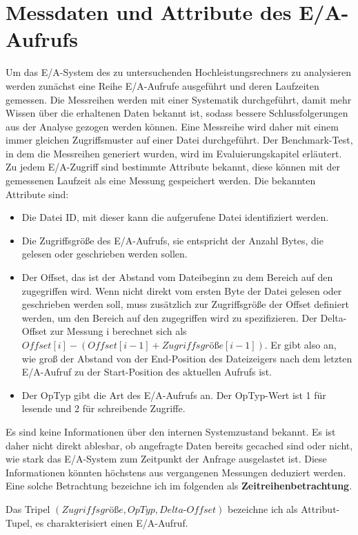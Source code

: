 \documentclass[
	12pt,
	a4paper,
	BCOR10mm,
	DIV14,
	listof=totoc,
	bibliography=totoc,
	headsepline
]{scrreprt}
\begin{document}
\section{Messdaten und Attribute des E/A-Aufrufs}
\label{analyse:mess+att}
Um das E/A-System des zu untersuchenden Hochleistungsrechners zu analysieren werden zunächst eine Reihe E/A-Aufrufe ausgeführt und deren Laufzeiten gemessen. Die Messreihen werden mit einer Systematik durchgeführt, damit mehr Wissen über die erhaltenen Daten bekannt ist, sodass bessere Schlussfolgerungen aus der Analyse gezogen werden können.
Eine Messreihe wird daher mit einem immer gleichen Zugriffsmuster auf einer Datei durchgeführt.
Der Benchmark-Test, in dem die Messreihen generiert wurden, wird im Evaluierungskapitel erläutert.
Zu jedem E/A-Zugriff sind bestimmte Attribute bekannt, diese können mit der gemessenen Laufzeit als eine Messung gespeichert werden.
Die bekannten Attribute sind:
\begin{itemize}
	\item Die Datei ID, mit dieser kann die aufgerufene Datei identifiziert werden.
	\item Die Zugriffsgröße des E/A-Aufrufs, sie entspricht der Anzahl Bytes, die gelesen oder geschrieben werden sollen. 
	\item Der Offset, das ist der Abstand vom Dateibeginn zu dem Bereich auf den zugegriffen wird. Wenn nicht direkt vom ersten Byte der Datei gelesen oder geschrieben werden soll, muss zusätzlich zur Zugriffsgröße der Offset definiert werden, um den Bereich auf den zugegriffen wird zu spezifizieren.
	Der Delta-Offset zur Messung i berechnet sich als $Offset[i] - (Offset[i-1] + Zugriffsgrö\text{ß}e[i-1])$. Er gibt also an, wie groß der Abstand von der End-Position des Dateizeigers nach dem letzten E/A-Aufruf zu der Start-Position des aktuellen Aufrufs ist.
	\item Der OpTyp gibt die Art des E/A-Aufrufs an. Der OpTyp-Wert ist 1 für lesende und 2 für schreibende Zugriffe.
\end{itemize}
Es sind keine Informationen über den internen Systemzustand bekannt. Es ist daher nicht direkt ablesbar, ob angefragte Daten bereits gecached sind oder nicht, wie stark das E/A-System zum Zeitpunkt der Anfrage ausgelastet ist.
Diese Informationen könnten höchstens aus vergangenen Messungen deduziert werden. Eine solche Betrachtung bezeichne ich im folgenden als \textbf{Zeitreihenbetrachtung}.

Das Tripel $(Zugriffsgrö\text{ß}e,OpTyp,Delta\text{-}Offset)$ bezeichne ich als Attribut-Tupel, es charakterisiert einen E/A-Aufruf.
\end{document}
